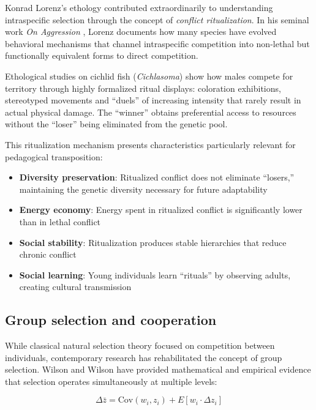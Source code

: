 Konrad Lorenz's ethology contributed extraordinarily to understanding intraspecific selection through the concept of \textit{conflict ritualization}. In his seminal work \textit{On Aggression} \cite{Lorenz1966}, Lorenz documents how many species have evolved behavioral mechanisms that channel intraspecific competition into non-lethal but functionally equivalent forms to direct competition.

\begin{example}
	\label{ex:cichlids}
	Ethological studies on cichlid fish (\textit{Cichlasoma}) show how males compete for territory through highly formalized ritual displays: coloration exhibitions, stereotyped movements and ``duels'' of increasing intensity that rarely result in actual physical damage. The ``winner'' obtains preferential access to resources without the ``loser'' being eliminated from the genetic pool.
\end{example}

This ritualization mechanism presents characteristics particularly relevant for pedagogical transposition:

\begin{itemize}
	\item \textbf{Diversity preservation}: Ritualized conflict does not eliminate ``losers,'' maintaining the genetic diversity necessary for future adaptability
	\item \textbf{Energy economy}: Energy spent in ritualized conflict is significantly lower than in lethal conflict
	\item \textbf{Social stability}: Ritualization produces stable hierarchies that reduce chronic conflict
	\item \textbf{Social learning}: Young individuals learn ``rituals'' by observing adults, creating cultural transmission
\end{itemize}

\subsection{Group selection and cooperation}

While classical natural selection theory focused on competition between individuals, contemporary research has rehabilitated the concept of group selection. Wilson and Wilson \cite{Wilson2007} have provided mathematical and empirical evidence that selection operates simultaneously at multiple levels:

\begin{equation}
	\Delta \bar{z} = \text{Cov}(w_i, z_i) + E[w_i \cdot \Delta z_i]
	\label{eq:multilevel-selection}
\end{equation}

